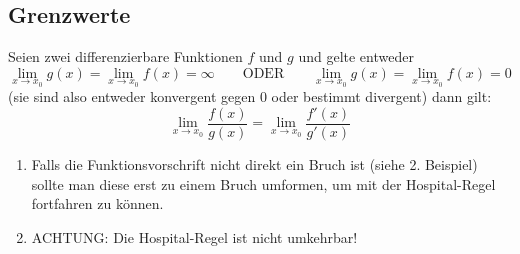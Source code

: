\documentclass[main.tex]{subfiles}
\begin{document}
\subsection{Grenzwerte}


\begin{Theorem}
	Seien zwei differenzierbare Funktionen $f$ und $g$ und gelte entweder
	$$\lim\limits_{x \rightarrow x_{0}}g(x) = \lim\limits_{x \rightarrow x_{0}}f(x) = \infty \qquad \text{ODER} \qquad  \lim\limits_{x \rightarrow x_{0}}g(x) = \lim\limits_{x \rightarrow x_{0}}f(x) = 0$$
	(sie sind also entweder konvergent gegen $0$ oder bestimmt divergent) dann gilt:
	$$\lim\limits_{x \rightarrow x_{0}} \dfrac{f(x)}{g(x)} = \lim\limits_{x \rightarrow x_{0}}\dfrac{f'(x)}{g'(x)}$$
\end{Theorem}

\begin{Bemerkung}
	\begin{enumerate}
		\item Falls die Funktionsvorschrift nicht direkt ein Bruch ist (siehe 2. Beispiel) sollte man diese erst zu einem Bruch umformen, um mit der Hospital-Regel fortfahren zu können.
		\item ACHTUNG: Die Hospital-Regel ist nicht umkehrbar!
	\end{enumerate}
\end{Bemerkung}
\end{document}
